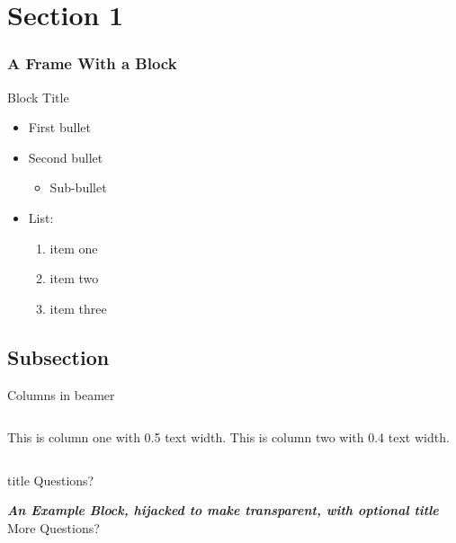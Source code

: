 \documentclass[aspectratio=1610]{beamer}
\begin{document}
\section{Section 1}
\begin{frame}
  \frametitle{A Frame With a Block}
  \begin{block}{Block Title}
  \begin{itemize}
  \item First bullet
  \item Second bullet
    \begin{itemize}
    \item Sub-bullet
    \end{itemize}
  \item List:
    \begin{enumerate}
    \item item one
    \item item two
    \item item three
    \end{enumerate}
  \end{itemize}
  \end{block}
\end{frame}



\subsection{Subsection}
\begin{frame}{Columns in beamer}
    \begin{columns}
        \centering
        This is column one with 0.5 text width.
        \centering
        This is column two with 0.4 text width.
    \end{columns}
\end{frame}



\begin{NCARprettyframe}
  \vspace{3em}
  \begin{beamercolorbox}[sep=8pt,center]{title}
    \Huge{\textcolor{HilightGreen}{Questions?}}
  \end{beamercolorbox}
  \begin{exampleblock}{\emph{\textbf{An Example Block, hijacked to make transparent, with optional title}}}
    \centering
    \Huge{\textcolor{UCARGreen}{More Questions?}}
  \end{exampleblock}{}
\end{NCARprettyframe}
\end{document}
